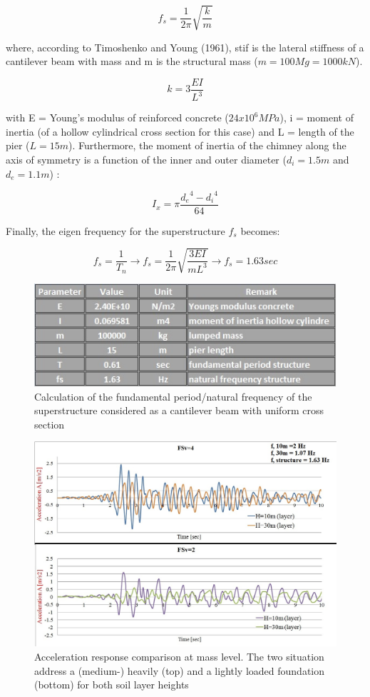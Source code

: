 \begin{equation}
	f_s=\frac{1}{2 \pi} \sqrt{\frac{k}{m}}
\end{equation}

where, according to Timoshenko and Young (1961), \gls{stif} is the lateral stiffness of a cantilever beam with mass and m is the structural mass ($m=100 Mg=1000 kN$).

\begin{equation}
	k=3\frac{EI}{L^3}
\end{equation}

with E = Young's modulus of reinforced concrete ($24x10^6 MPa$), \gls{i} = moment of inertia (of a hollow cylindrical cross section for this case) and L = length of the pier ($L=15m$). Furthermore, the moment of inertia of the chimney along the axis of symmetry is a function of the inner and outer diameter ($d_i=1.5m$ and $d_e=1.1m$) :
 
\begin{equation}
	I_x=\pi \frac{{d_e}^4-{d_i}^4}{64}
\end{equation}

Finally, the eigen frequency for the superstructure $f_s$ becomes:

\begin{equation}
	f_s=\frac{1}{T_n} \longrightarrow f_s=\frac{1}{2 \pi} \sqrt{\frac{3EI}{mL^3}} \longrightarrow f_s=1.63 sec
\end{equation}

\begin{figure}[h]
	\centering
	\includegraphics[width=0.7 \linewidth]{"fundamental"}
	\caption{Calculation of the fundamental period/natural frequency of the superstructure considered as a cantilever beam with uniform cross section}
	\label{fundam}
\end{figure}

 \begin{figure}[h]
 	\centering
 	\includegraphics[width=0.7 \linewidth]{"acc_10m"}
 	\caption{Acceleration response comparison at mass level. The two situation address a (medium-) heavily (top) and a lightly loaded foundation (bottom) for both soil layer heights}
 	\label{10}
 \end{figure}

